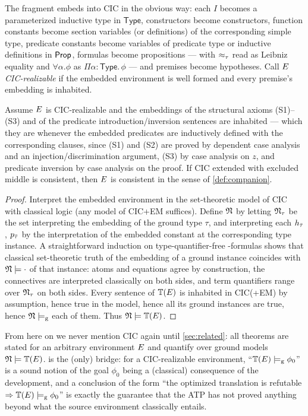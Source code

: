 The fragment embeds into CIC in the obvious way: each $I$ becomes a
parameterized inductive type in $\mathsf{Type}$, constructors become
constructors, function constants become section variables (or definitions)
of the corresponding simple type, predicate constants become variables of
predicate type or inductive definitions in $\mathsf{Prop}$, formulas become
propositions --- with $\approx_{\tau}$ read as Leibniz equality and
$\forall\alpha.\phi$ as $\Pi \alpha{:}\mathsf{Type}.\,\phi$ --- and
premises become hypotheses.  Call $E$ \emph{CIC-realizable} if the
embedded environment is well formed and every premise's embedding is
inhabited.

\begin{proposition}
  \label{prop:cic-bridge}
  Assume $E$ is CIC-realizable and the embeddings of the structural
  axioms (S1)--(S3) and of the predicate introduction/inversion sentences
  are inhabited --- which they are whenever the embedded predicates are
  inductively defined with the corresponding clauses, since (S1) and (S2)
  are proved by dependent case analysis and an injection/discrimination
  argument, (S3) by case analysis on $z$, and predicate inversion by case
  analysis on the proof.  If CIC extended with excluded middle is
  consistent, then $E$ is consistent in the sense of
  \cref{def:companion}.
\end{proposition}

\begin{proof}
  Interpret the embedded environment in the set-theoretic model of CIC with
  classical logic \cite{Werner1997,LeeWerner2011} (any model of CIC+EM
  suffices).  Define $\mathfrak{N}$ by letting $\mathfrak{N}_\tau$ be the set interpreting the
  embedding of the ground type $\tau$, and interpreting each $h_{\bar{\tau}}$,
  $p_{\bar{\tau}}$ by the interpretation of the embedded constant at the
  corresponding type instance.  A straightforward induction on
  type-quantifier-free \Frag-formulas shows that classical set-theoretic
  truth of the embedding of a ground instance coincides with
  $\mathfrak{N} \models \cdot$ of that instance: atoms and equations agree by
  construction, the connectives are interpreted classically on both sides,
  and term quantifiers range over $\mathfrak{N}_\tau$ on both sides.  Every sentence
  of $\mathbb{T}(E)$ is inhabited in CIC(+EM) by assumption, hence true in the model,
  hence all its ground instances are true, hence $\mathfrak{N} \models_{\mathrm{g}}$ each of them.
  Thus $\mathfrak{N} \models \mathbb{T}(E)$.
\end{proof}

From here on we never mention CIC again until \cref{sec:related}: all
theorems are stated for an arbitrary environment $E$ and quantify over
ground models $\mathfrak{N} \models \mathbb{T}(E)$.   is the (only)
bridge: for a CIC-realizable environment, ``$\mathbb{T}(E) \models_{\mathrm{g}} \phi_0$'' is a sound
notion of the goal $\phi_0$ being a (classical) consequence of the
development, and a conclusion of the form ``the optimized translation is
refutable $\Rightarrow \mathbb{T}(E) \models_{\mathrm{g}} \phi_0$'' is exactly the guarantee that
the ATP has not proved anything beyond what the source environment
classically entails.

